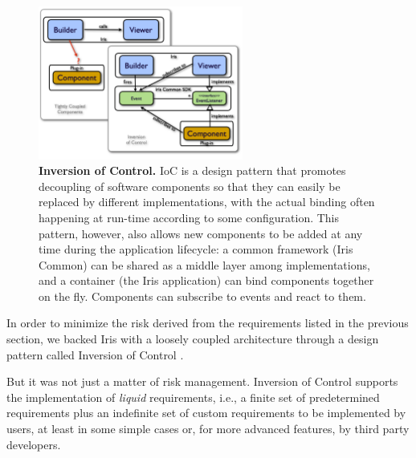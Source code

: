 \documentclass[preprint,authoryear,5p]{elsarticle}
\begin{document}
\begin{figure} \begin{center}
\includegraphics[width=0.6\textwidth]{IrisDiagrams.003.pdf}
\caption{\textbf{Inversion of Control.}  IoC is a design pattern that promotes
decoupling of software components so that they can easily be replaced by
different implementations, with the actual binding often happening at run-time
according to some configuration. This pattern, however, also allows new
components to be added at any time during the application lifecycle: a common
framework (Iris Common) can be shared as a middle layer among implementations,
and a container (the Iris application) can bind components together on the fly.
Components can subscribe to events and react to them.} \label{fig:ioc}
\end{center} \end{figure}

In order to minimize the risk derived from the requirements listed in the previous 
section, we backed Iris with a loosely coupled architecture through a design 
pattern called Inversion of Control \citep*{ioc}. 

But it was not just a matter of risk management. Inversion of Control  
supports the implementation of \emph{liquid} requirements, i.e., a finite set of
predetermined requirements plus an indefinite set of custom requirements to be
implemented by users, at least in some simple cases or, for more advanced
features, by third party developers.
\end{document}
